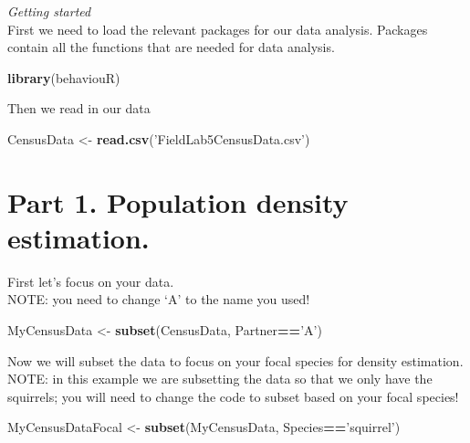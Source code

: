 \documentclass[]{book}
\newenvironment{Shaded}{\begin{snugshade}}{\end{snugshade}}
\newcommand{\KeywordTok}[1]{\textcolor[rgb]{0.13,0.29,0.53}{\textbf{#1}}}
\newcommand{\NormalTok}[1]{#1}
\newcommand{\OperatorTok}[1]{\textcolor[rgb]{0.81,0.36,0.00}{\textbf{#1}}}
\newcommand{\StringTok}[1]{\textcolor[rgb]{0.31,0.60,0.02}{#1}}
\begin{document}
\emph{Getting started}\\
First we need to load the relevant packages for our data analysis. Packages contain all the functions that are needed for data analysis.

\begin{Shaded}
\begin{Highlighting}[]
\KeywordTok{library}\NormalTok{(behaviouR)}
\end{Highlighting}
\end{Shaded}

Then we read in our data

\begin{Shaded}
\begin{Highlighting}[]
\NormalTok{CensusData <-}\StringTok{ }\KeywordTok{read.csv}\NormalTok{(}\StringTok{'FieldLab5CensusData.csv'}\NormalTok{)}
\end{Highlighting}
\end{Shaded}

\hypertarget{part-1.-population-density-estimation.}{%
\section{Part 1. Population density estimation.}\label{part-1.-population-density-estimation.}}

First let's focus on your data.\\
NOTE: you need to change `A' to the name you used!

\begin{Shaded}
\begin{Highlighting}[]
\NormalTok{MyCensusData <-}\StringTok{ }\KeywordTok{subset}\NormalTok{(CensusData, Partner}\OperatorTok{==}\StringTok{'A'}\NormalTok{)}
\end{Highlighting}
\end{Shaded}

Now we will subset the data to focus on your focal species for density estimation. NOTE: in this example we are subsetting the data so that we only have the squirrels; you will need to change the code to subset based on your focal species!

\begin{Shaded}
\begin{Highlighting}[]
\NormalTok{MyCensusDataFocal <-}\StringTok{ }\KeywordTok{subset}\NormalTok{(MyCensusData, Species}\OperatorTok{==}\StringTok{'squirrel'}\NormalTok{)}
\end{Highlighting}
\end{Shaded}
\end{document}

